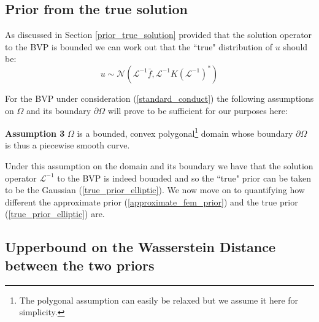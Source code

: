 \subsection{Prior from the true solution}

As discussed in Section \textcolor{blue}{\ref{prior_true_solution}} provided that the solution operator to the BVP is bounded we can work out that the ``true" distribution of $u$ should be:
\begin{equation}
    \label{true_prior_elliptic}
    u\sim\mathcal{N}(\mathcal{L}^{-1}\bar{f},\mathcal{L}^{-1}K(\mathcal{L}^{-1})^{*})
\end{equation}

For the BVP under consideration (\ref{standard_conduct}) the following assumptions on $\Omega$ and its boundary $\partial\Omega$ will prove to be sufficient for our purposes here:

\noindent \textbf{Assumption 3 } $\Omega$ is a bounded, convex polygonal\footnote{The polygonal assumption can easily be relaxed but we assume it here for simplicity.} domain whose boundary $\partial\Omega$ is thus a piecewise smooth curve.

Under this assumption on the domain and its boundary we have that the solution operator $\mathcal{L}^{-1}$ to the BVP is indeed bounded and so the ``true" prior can be taken to be the Gaussian (\ref{true_prior_elliptic}). We now move on to quantifying how different the approximate prior (\ref{approximate_fem_prior}) and the true prior (\ref{true_prior_elliptic}) are.

\subsection{Upperbound on the Wasserstein Distance between the two priors}

